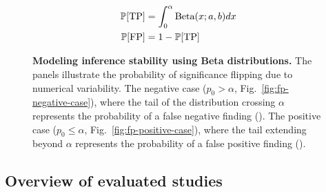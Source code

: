 \begin{figure}[h]
\begin{minipage}[t]{0.48\textwidth}
        \begin{align*}
            \mathbb{P}[\mathrm{TP}] & = \int_0^\alpha \text{Beta}(x; a, b) dx \\
            \mathbb{P}[\mathrm{FP}] & = 1 - \mathbb{P}[\mathrm{TP}]
        \end{align*}
    \end{minipage}
    \caption{\textbf{Modeling inference stability using Beta distributions.}
        The panels illustrate the probability of significance flipping due to
        numerical variability. The negative case ($p_0 > \alpha$,
        Fig.~\ref{fig:fp-negative-case}), where the tail of the distribution
        crossing $\alpha$ represents the probability of a false negative finding
        (\FN). The positive case ($p_0 \leq \alpha$,
        Fig.~\ref{fig:fp-positive-case}), where the tail extending beyond
        $\alpha$ represents the probability of a false positive finding
        (\FP).\label{fig:false-positives-model}}
\end{figure}

\subsection{Overview of evaluated studies\label{sec:retrospective_studies}}

